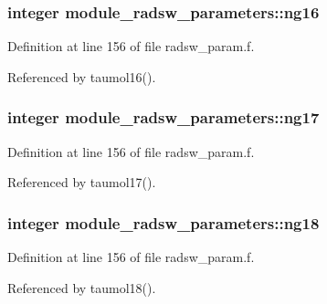 \subsubsection[{\texorpdfstring{ng16}{ng16}}]{\setlength{\rightskip}{0pt plus 5cm}integer module\+\_\+radsw\+\_\+parameters\+::ng16}\hypertarget{group__module__radsw__main_ga442b3758f00a388cd8b7129ba910942a}{}\label{group__module__radsw__main_ga442b3758f00a388cd8b7129ba910942a}


Definition at line 156 of file radsw\+\_\+param.\+f.



Referenced by taumol16().

\subsubsection[{\texorpdfstring{ng17}{ng17}}]{\setlength{\rightskip}{0pt plus 5cm}integer module\+\_\+radsw\+\_\+parameters\+::ng17}\hypertarget{group__module__radsw__main_gaf1f90ffe5780463d1e2edbe0e8dfd1f9}{}\label{group__module__radsw__main_gaf1f90ffe5780463d1e2edbe0e8dfd1f9}


Definition at line 156 of file radsw\+\_\+param.\+f.



Referenced by taumol17().

\subsubsection[{\texorpdfstring{ng18}{ng18}}]{\setlength{\rightskip}{0pt plus 5cm}integer module\+\_\+radsw\+\_\+parameters\+::ng18}\hypertarget{group__module__radsw__main_gac00a8e59e4f7e584af9b453c2c9fe35d}{}\label{group__module__radsw__main_gac00a8e59e4f7e584af9b453c2c9fe35d}


Definition at line 156 of file radsw\+\_\+param.\+f.



Referenced by taumol18().

